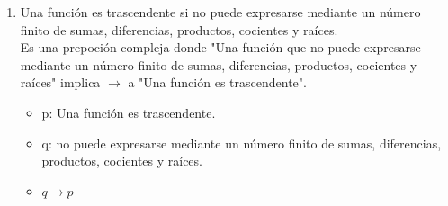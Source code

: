 \documentclass[a4paper,10pt]{article}
\begin{document}
\begin{enumerate}
\item Una función es trascendente si no puede expresarse mediante un número finito de sumas, diferencias, productos, cocientes y raíces.\\
Es una prepoción compleja donde "Una función que no puede expresarse mediante un número finito de sumas, diferencias, productos, cocientes y raíces" implica \(\to\) a "Una función es trascendente".

\begin{itemize}
 \item p: Una función es trascendente.
 \item q: no puede expresarse mediante un número finito de sumas, diferencias, productos, cocientes y raíces.
 \item \(q \to p\)
\end{itemize}

\end{enumerate}
 
\end{document}

